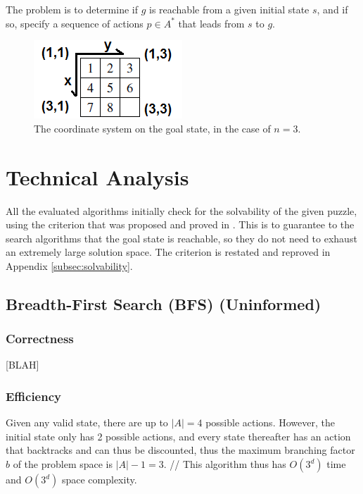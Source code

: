 \documentclass[runningheads]{llncs}
\begin{document}
The problem is to determine if $g$ is reachable from a given initial state $s$, and if so, specify a sequence of actions $p \in A^\ast$ that leads from $s$ to $g$.



\begin{figure}
	\centering
	\includegraphics{coord_system.png}
	\caption{The coordinate system on the goal state, in the case of $n=3$.} \label{fig:coordsystem}
\end{figure}



\section{Technical Analysis}
All the evaluated algorithms initially check for the solvability of the given puzzle, using the criterion that was proposed and proved in \cite{Solvability}. This is to guarantee to the search algorithms that the goal state is reachable, so they do not need to exhaust an extremely large solution space.
The criterion is restated and reproved in Appendix \ref{subsec:solvability}.

\subsection{Breadth-First Search (BFS) (Uninformed)}
\subsubsection{Correctness}
[BLAH]

\subsubsection{Efficiency}
Given any valid state, there are up to $|A|=4$ possible actions. However, the initial state only has 2 possible actions, and every state thereafter has an action that backtracks and can thus be discounted, thus the maximum branching factor $b$ of the problem space is $|A|-1=3$. // This algorithm thus has $O(3^d)$ time and $O(3^d)$ space complexity.
\end{document}
